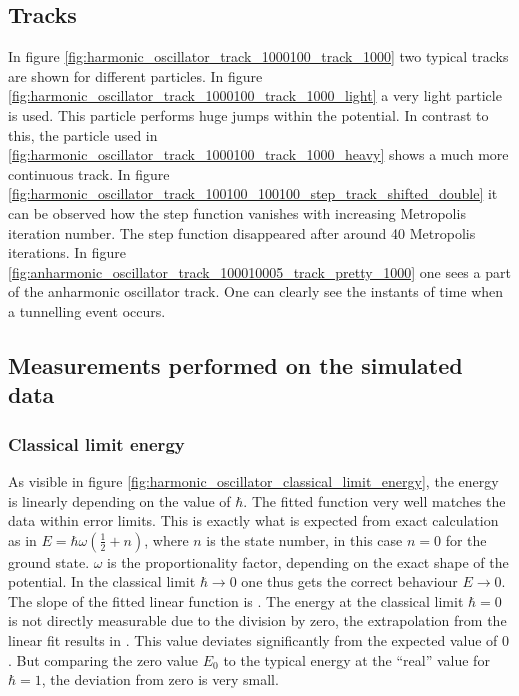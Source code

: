 \documentclass{scrartcl}
\begin{document}
	\subsection{Tracks}
		In figure \ref{fig:harmonic_oscillator_track_1000100_track_1000} two typical tracks are shown for different particles.
		In figure \ref{fig:harmonic_oscillator_track_1000100_track_1000_light} a very light particle is used.
		This particle performs huge jumps within the potential.
		In contrast to this, the particle used in \ref{fig:harmonic_oscillator_track_1000100_track_1000_heavy} shows a much more continuous track.
		In figure \ref{fig:harmonic_oscillator_track_100100_100100_step_track_shifted_double} it can be observed how the step function vanishes with increasing Metropolis iteration number.
		The step function disappeared after around 40 Metropolis iterations.
		In figure \ref{fig:anharmonic_oscillator_track_100010005_track_pretty_1000} one sees a part of the anharmonic oscillator track.
		One can clearly see the instants of time when a tunnelling event occurs.

	\subsection{Measurements performed on the simulated data}
	\subsubsection{Classical limit energy}
		As visible in figure \ref{fig:harmonic_oscillator_classical_limit_energy}, the energy is linearly depending on the value of $\hbar$.
		The fitted function very well matches the data within error limits.
		This is exactly what is expected from exact calculation as in $E = \hbar \omega \left(\frac 12 + n\right)$, where $n$ is the state number, in this case $n = 0$ for the ground state.
		$\omega$ is the proportionality factor, depending on the exact shape of the potential.
		In the classical limit $\hbar \rightarrow 0$ one thus gets the correct behaviour $E \rightarrow 0$.
		The slope of the fitted linear function is \unskip.
		The energy at the classical limit $\hbar = 0$ is not directly measurable due to the division by zero, the extrapolation from the linear fit results in \unskip.
		This value deviates significantly from the expected value of $0$.
		But comparing the zero value $E_0$ to the typical energy at the \enquote{real} value for $\hbar = 1$, the deviation from zero is very small.
\end{document}
